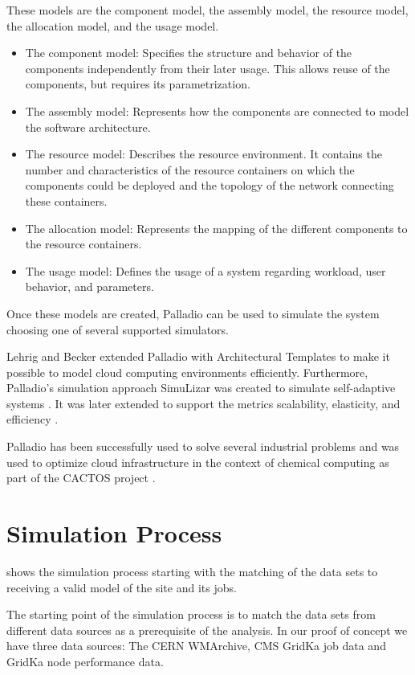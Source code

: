 \documentclass[a4paper]{jpconf}
\begin{document}
These models are the component model, the assembly model, the resource model, the allocation model, and the usage model.
\begin{itemize}
	\item The component model: Specifies the structure and behavior of the components independently from their later usage. This allows reuse of the components, but requires its parametrization.
	\item The assembly model: Represents how the components are connected to model the software architecture.
	\item The resource model: Describes the resource environment. It contains the number and characteristics of the resource containers on which the components could be deployed and the topology of the network connecting these containers.
	\item The allocation model: Represents the mapping of the different components to the resource containers.
	\item The usage model: Defines the usage of a system regarding workload, user behavior, and parameters.
	
\end{itemize}
Once these models are created, Palladio can be used to simulate the system choosing one of several supported simulators. 

Lehrig and Becker \cite{arch} extended Palladio with Architectural Templates to make it possible to model cloud computing environments efficiently.
Furthermore, Palladio's simulation approach SimuLizar was created to simulate self-adaptive systems \cite{becker2013simulizar}.
It was later extended to support the metrics scalability, elasticity, and efficiency \cite{arch}.

Palladio has been successfully used to solve several industrial problems and was used to optimize cloud infrastructure in the context of chemical computing as part of the CACTOS project \cite{rapidtesting}. 

\section{Simulation Process}
\label{sec:process}

 shows the simulation process starting with the matching of the data sets to receiving a valid model of the site and its jobs.

The starting point of the simulation process is to match the data sets from different data sources as a prerequisite  of the analysis. In our proof of concept we have three data sources: The CERN WMArchive, CMS GridKa job data and GridKa node performance data.
\end{document}
